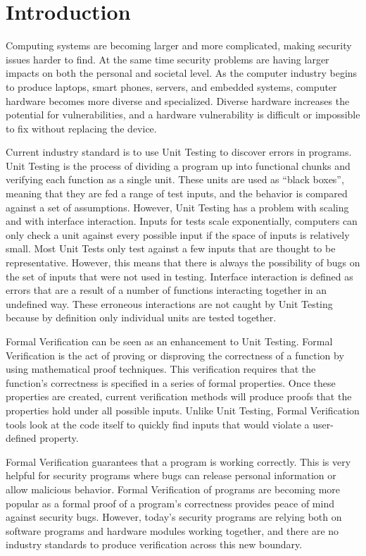 \chapter{Introduction}

Computing systems are becoming larger and more complicated, making security
issues harder to find.
At the same time security problems are having larger impacts on both the personal and societal level.
As the computer industry begins to produce laptops, smart phones, servers, and embedded systems, computer
hardware becomes more diverse and specialized. Diverse hardware increases the
potential for vulnerabilities, and a hardware vulnerability is difficult or
impossible to fix without replacing the device. 

Current industry standard is to use Unit Testing to discover errors in programs. 
Unit Testing is the process of dividing a program up into functional chunks and
verifying each function as a single unit. 
These units are used as ``black boxes'', meaning that they are fed a range
of test inputs, and the behavior is compared against a set of assumptions.
However, Unit Testing has a problem with scaling and with interface interaction.
Inputs for tests scale exponentially, computers can only check a unit against
every possible input if the space of inputs is relatively small. 
Most Unit Tests only test against a few inputs that are thought to be
representative. 
However, this means that there is always the possibility of bugs
on the set of inputs that were not used in testing.
Interface interaction is defined as errors that are a result of a number of
functions interacting together in an undefined way.
These erroneous interactions are not caught by Unit Testing because by
definition only individual units are tested together. 

Formal Verification can be seen as an enhancement to Unit Testing. 
Formal Verification is the act of proving or disproving the correctness of a
function by using mathematical proof techniques. 
This verification requires that the function's correctness is specified in a
series of formal properties.
Once these properties are created, current verification methods 
will produce proofs that the properties hold under all possible inputs.
Unlike Unit Testing, Formal Verification tools look at the code itself to quickly find inputs that would violate a user-defined property. 

Formal Verification guarantees that a program is working correctly. 
This is very helpful for security programs where bugs can release personal information or allow malicious behavior.
Formal Verification of programs are becoming more popular as a formal proof of
a program's correctness provides peace of mind against security bugs.
However, today's security programs are relying both on software programs and
hardware modules working together, and there are no industry standards to
produce verification across this new boundary.

